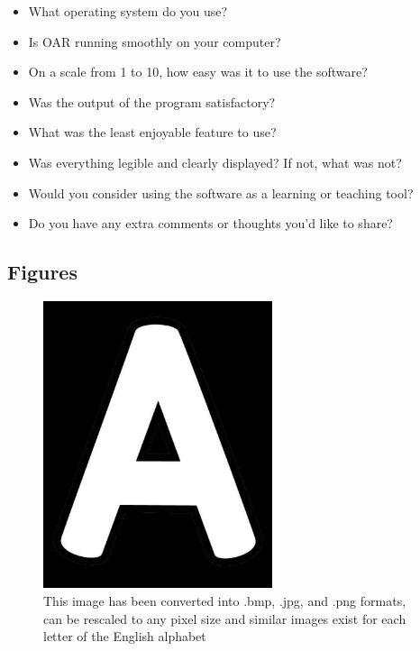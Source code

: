\documentclass[12pt, titlepage]{article}
\begin{document}
\begin{itemize}
  \item{What operating system do you use?}
  \item{Is OAR running smoothly on your computer?}
  \item{On a scale from 1 to 10, how easy was it to use the software?}
  \item{Was the output of the program satisfactory?}
  \item{What was the least enjoyable feature to use?}
  \item{Was everything legible and clearly displayed? If not, what was not?}
  \item{Would you consider using the software as a learning or teaching tool?}
  \item{Do you have any extra comments or thoughts you'd like to share?}
\end{itemize}

\subsection{Figures}

\begin{figure}[h!]
  \begin{center}
   \includegraphics[width=0.6\textwidth]{A}
  \caption{This image has been converted into .bmp, .jpg, and .png formats, can be rescaled to any pixel size 
  and similar images exist for each letter of the English alphabet}
  \label{Fig_A} 
  \end{center}
  \end{figure}
\end{document}
